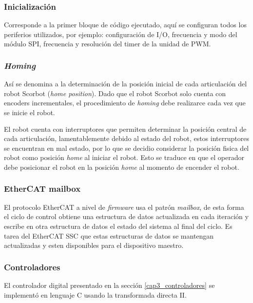 \subsubsection{Inicialización}

Corresponde a la primer bloque de código ejecutado, aquí se configuran todos los periferios utilizados, por ejemplo: configuración de I/O, frecuencia y modo del módulo SPI, frecuencia y resolución del timer de la unidad de PWM.

\subsubsection{\textit{Homing}}

Así se denomina a la determinación de la posición inicial de cada articulación del robot Scorbot (\textit{home position}). Dado que el robot Scorbot solo cuenta con encoders incrementales, el procedimiento de \textit{homing} debe realizarce cada vez que se inicie el robot.

El robot cuenta con interruptores que permiten determinar la posición central de cada articulación, lamentablemente debido al estado del robot, estos interruptores se encuentran en mal estado, por lo que se decidio considerar la posición fisica del robot como posición \textit{home} al iniciar el robot. Esto se traduce en que el operador debe posicionar el robot en la posición \textit{home} al momento de encender el robot.

\subsubsection{EtherCAT mailbox}

El protocolo EtherCAT a nivel de \textit{firmware} usa el patrón \textit{mailbox}, de esta forma el ciclo de control obtiene una estructura de datos actualizada en cada iteración y escribe en otra estructura de datos el estado del sistema al final del ciclo. Es tarea del EtherCAT SSC que estas estructuras de datos se mantengan actualizadas y esten disponibles para el dispositivo maestro.
 
\subsubsection{Controladores}

El controlador digital presentado en la sección \ref{cap3_controladores} se implementó en lenguaje C usando la transformada directa II.


